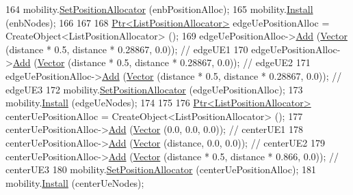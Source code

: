 \begin{DoxyCode}
164   mobility.\hyperlink{classns3_1_1MobilityHelper_ac59d5295076be3cc11021566713a28c5}{SetPositionAllocator} (enbPositionAlloc);
165   mobility.\hyperlink{classns3_1_1MobilityHelper_a07737960ee95c0777109cf2994dd97ae}{Install} (enbNodes);
166 
167 
168   \hyperlink{classns3_1_1Ptr}{Ptr<ListPositionAllocator>} edgeUePositionAlloc = 
      CreateObject<ListPositionAllocator> ();
169   edgeUePositionAlloc->\hyperlink{classns3_1_1ListPositionAllocator_a460e82f015ac012a73ba0ea0cccb3486}{Add} (\hyperlink{classns3_1_1Vector3D_a7e59b47bc94c9cb1dadff68c1d0112d8}{Vector} (distance * 0.5, distance * 0.28867, 0.0));  \textcolor{comment}{// edgeUE1}
170   edgeUePositionAlloc->\hyperlink{classns3_1_1ListPositionAllocator_a460e82f015ac012a73ba0ea0cccb3486}{Add} (\hyperlink{classns3_1_1Vector3D_a7e59b47bc94c9cb1dadff68c1d0112d8}{Vector} (distance * 0.5, distance * 0.28867, 0.0));  \textcolor{comment}{// edgeUE2}
171   edgeUePositionAlloc->\hyperlink{classns3_1_1ListPositionAllocator_a460e82f015ac012a73ba0ea0cccb3486}{Add} (\hyperlink{classns3_1_1Vector3D_a7e59b47bc94c9cb1dadff68c1d0112d8}{Vector} (distance * 0.5, distance * 0.28867, 0.0));  \textcolor{comment}{// edgeUE3}
172   mobility.\hyperlink{classns3_1_1MobilityHelper_ac59d5295076be3cc11021566713a28c5}{SetPositionAllocator} (edgeUePositionAlloc);
173   mobility.\hyperlink{classns3_1_1MobilityHelper_a07737960ee95c0777109cf2994dd97ae}{Install} (edgeUeNodes);
174 
175 
176   \hyperlink{classns3_1_1Ptr}{Ptr<ListPositionAllocator>} centerUePositionAlloc = 
      CreateObject<ListPositionAllocator> ();
177   centerUePositionAlloc->\hyperlink{classns3_1_1ListPositionAllocator_a460e82f015ac012a73ba0ea0cccb3486}{Add} (\hyperlink{classns3_1_1Vector3D_a7e59b47bc94c9cb1dadff68c1d0112d8}{Vector} (0.0, 0.0, 0.0));                                      \textcolor{comment}{//
       centerUE1}
178   centerUePositionAlloc->\hyperlink{classns3_1_1ListPositionAllocator_a460e82f015ac012a73ba0ea0cccb3486}{Add} (\hyperlink{classns3_1_1Vector3D_a7e59b47bc94c9cb1dadff68c1d0112d8}{Vector} (distance,  0.0, 0.0));                            \textcolor{comment}{//
       centerUE2}
179   centerUePositionAlloc->\hyperlink{classns3_1_1ListPositionAllocator_a460e82f015ac012a73ba0ea0cccb3486}{Add} (\hyperlink{classns3_1_1Vector3D_a7e59b47bc94c9cb1dadff68c1d0112d8}{Vector} (distance * 0.5, distance * 0.866, 0.0));      \textcolor{comment}{// centerUE3}
180   mobility.\hyperlink{classns3_1_1MobilityHelper_ac59d5295076be3cc11021566713a28c5}{SetPositionAllocator} (centerUePositionAlloc);
181   mobility.\hyperlink{classns3_1_1MobilityHelper_a07737960ee95c0777109cf2994dd97ae}{Install} (centerUeNodes);

\end{DoxyCode}
